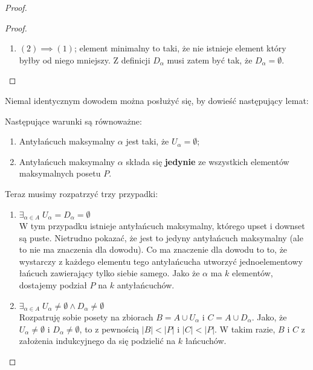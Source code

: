 \begin{proof}
\begin{proof}
\begin{enumerate}
                \item \( (2) \implies (1) \); element minimalny to taki, że nie istnieje element który byłby od niego mniejszy. Z definicji \(D_{\alpha}\) musi zatem być tak, że \(D_{\alpha} = \emptyset\). 
            \end{enumerate}
        \end{proof}
        
        Niemal identycznym dowodem można posłużyć się, by dowieść następujący lemat:
        
        \begin{lemma}
            \label{dilworth-lemma-2}
            Następujące warunki są równoważne:
            
            \begin{enumerate}
                \item Antyłańcuch maksymalny \(\alpha\) jest taki, że \(U_{\alpha} = \emptyset\);
                \item Antyłańcuch maksymalny \(\alpha\) składa się \textbf{jedynie} ze wszystkich elementów maksymalnych posetu \(P\). 
            \end{enumerate}
        \end{lemma}

        Teraz musimy rozpatrzyć trzy przypadki:
        \begin{enumerate}
            \item \( \exists_{\alpha \in A} \; U_{\alpha} = D_{\alpha} = \emptyset \) \\ 
            W tym przypadku istnieje antyłańcuch maksymalny, którego upset i downset są puste. Nietrudno pokazać, że jest to jedyny antyłańcuch maksymalny (ale to nie ma znaczenia dla dowodu). Co ma znaczenie dla dowodu to to, że wystarczy z każdego elementu tego antyłańcucha utworzyć jednoelementowy łańcuch zawierający tylko siebie samego. Jako że \(\alpha\) ma \(k\) elementów, dostajemy podział \(P\) na \(k\) antyłańcuchów.
            
            \item \( \exists_{\alpha \in A} \; U_{\alpha} \not = \emptyset \wedge D_{\alpha} \not = \emptyset\) \\
            Rozpatruję sobie posety na zbiorach \(B = A \cup U_{\alpha}\) i \(C = A \cup D_{\alpha}\). Jako, że \(U_{\alpha} \not = \emptyset\) i \(D_{\alpha} \not = \emptyset\), to z pewnością \( |B| < |P|\) i \( |C| < |P|\). W takim razie, \(B\) i \(C\) z założenia indukcyjnego da się podzielić na \(k\) łańcuchów.
            

\end{enumerate}
\end{proof}
